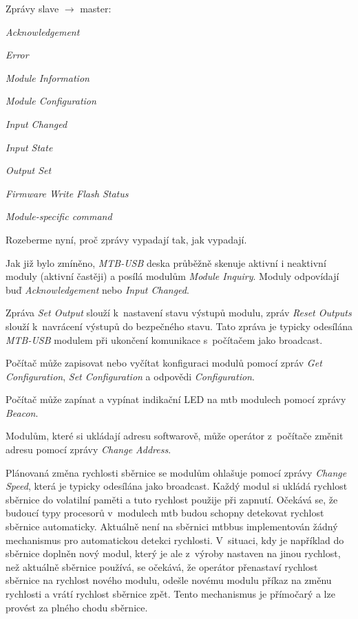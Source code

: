 Zprávy slave $\rightarrow$ master:

\begin{compactitem}
\item \textit{Acknowledgement}
\item \textit{Error}
\item \textit{Module Information}
\item \textit{Module Configuration}
\item \textit{Input Changed}
\item \textit{Input State}
\item \textit{Output Set}
\item \textit{Firmware Write Flash Status}
\item \textit{Module-specific command}
\end{compactitem}



Rozeberme nyní, proč zprávy vypadají tak, jak vypadají.

Jak již bylo zmíněno, \textit{MTB-USB} deska průběžně skenuje aktivní
i neaktivní moduly (aktivní častěji) a posílá modulům \textit{Module Inquiry}.
Moduly odpovídají buď \textit{Acknowledgement} nebo \textit{Input Changed}.

Zpráva \textit{Set Output} slouží k~nastavení stavu výstupů modulu, zpráv
\textit{Reset Outputs} slouží k~navrácení výstupů do bezpečného stavu.
Tato zpráva je typicky odesílána \textit{MTB-USB} modulem při ukončení komunikace
s~počítačem jako broadcast.

Počítač může zapisovat nebo vyčítat konfiguraci modulů pomocí zpráv
\textit{Get Configuration}, \textit{Set Configuration} a odpovědi
\textit{Configuration}.

Počítač může zapínat a vypínat indikační LED na \gls{mtb} modulech pomocí
zprávy \textit{Beacon}.

Modulům, které si ukládají adresu softwarově, může operátor z~počítače změnit
adresu pomocí zprávy \textit{Change Address}.

Plánovaná změna rychlosti sběrnice se modulům ohlašuje pomocí zprávy
\textit{Change Speed}, která je typicky odesílána jako broadcast. Každý modul
si ukládá rychlost sběrnice do volatilní paměti a tuto rychlost použije při
zapnutí. Očekává se, že budoucí typy procesorů v~modulech \gls{mtb} budou
schopny detekovat rychlost sběrnice automaticky. Aktuálně není na sběrnici
\gls{mtbbus} implementován žádný mechanismus pro automatickou detekci rychlosti.
V~situaci, kdy je například do sběrnice doplněn nový modul, který je ale
z~výroby nastaven na jinou rychlost, než aktuálně sběrnice používá, se očekává,
že operátor přenastaví rychlost sběrnice na rychlost nového modulu, odešle
novému modulu příkaz na změnu rychlosti a vrátí rychlost sběrnice zpět.
Tento mechanismus je přímočarý a lze provést za plného chodu sběrnice.

